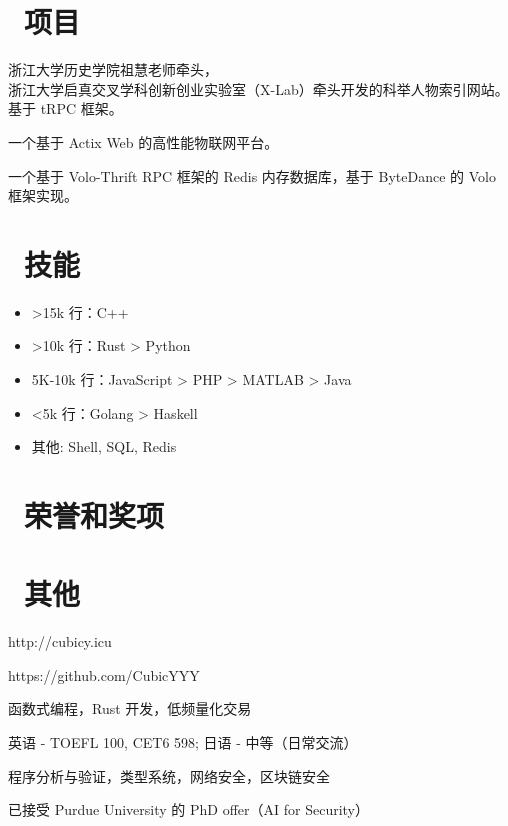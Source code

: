 \documentclass{resume}
\begin{document}
\section{\faFileCodeO\ 项目}
浙江大学历史学院祖慧老师牵头， \\ 
浙江大学启真交叉学科创新创业实验室（X-Lab）牵头开发的科举人物索引网站。\\
基于 tRPC 框架。

一个基于 Actix Web 的高性能物联网平台。

一个基于 Volo-Thrift RPC 框架的 Redis 内存数据库，基于 ByteDance 的 Volo 框架实现。

\section{\faCogs\ 技能}
\begin{itemize}[parsep=0.2ex]
  \item >15k 行：C++
  \item >10k 行：Rust > Python
  \item 5K-10k 行：JavaScript > PHP > MATLAB > Java
  \item <5k 行：Golang > Haskell
  \item 其他: Shell, SQL, Redis
\end{itemize}

\section{\faHeartO\ 荣誉和奖项}


\section{\faInfo\ 其他}
\begin{description}[parsep=0.2ex]
  \item[个人博客] http://cubicy.icu
  \item[GitHub] https://github.com/CubicYYY
  \item[技术兴趣] 函数式编程，Rust 开发，低频量化交易
  \item[语言能力] 英语 - TOEFL 100, CET6 598; 日语 - 中等（日常交流）
  \item[研究兴趣] 程序分析与验证，类型系统，网络安全，区块链安全
  \item[升学计划] 已接受 Purdue University 的 PhD offer（AI for Security）
\end{description}

%
%
\end{document}
